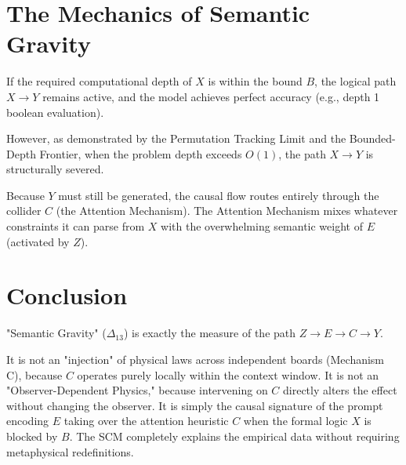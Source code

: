 \documentclass[12pt,a4paper]{article}
\begin{document}
\begin{center}
\end{center}

\section{The Mechanics of Semantic Gravity}

If the required computational depth of $X$ is within the bound $B$, the logical path $X \to Y$ remains active, and the model achieves perfect accuracy (e.g., depth 1 boolean evaluation).

However, as demonstrated by the Permutation Tracking Limit and the Bounded-Depth Frontier, when the problem depth exceeds $O(1)$, the path $X \to Y$ is structurally severed.

Because $Y$ must still be generated, the causal flow routes entirely through the collider $C$ (the Attention Mechanism). The Attention Mechanism mixes whatever constraints it can parse from $X$ with the overwhelming semantic weight of $E$ (activated by $Z$).

\section{Conclusion}

"Semantic Gravity" ($\Delta_{13}$) is exactly the measure of the path $Z \to E \to C \to Y$.

It is not an "injection" of physical laws across independent boards (Mechanism C), because $C$ operates purely locally within the context window. It is not an "Observer-Dependent Physics," because intervening on $C$ directly alters the effect without changing the observer. It is simply the causal signature of the prompt encoding $E$ taking over the attention heuristic $C$ when the formal logic $X$ is blocked by $B$. The SCM completely explains the empirical data without requiring metaphysical redefinitions.
\end{document}
